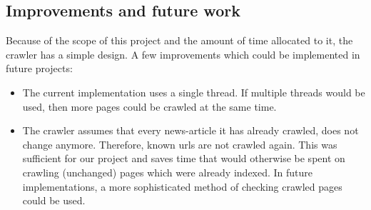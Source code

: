 \subsection*{Improvements and future work}
Because of the scope of this project and the amount of time allocated to it, the crawler has a simple design. A few improvements which could be implemented in future projects:
\begin{itemize}
\item The current implementation uses  a single thread. If multiple threads would be used, then more pages could be crawled at the same time.
\item The crawler assumes that every news-article it has already crawled, does not change anymore. Therefore, known urls are not crawled again. This was sufficient for our project and saves time that would otherwise be spent on crawling (unchanged) pages which were already indexed. In future implementations, a more sophisticated method of checking  crawled pages could be used.
\end{itemize}